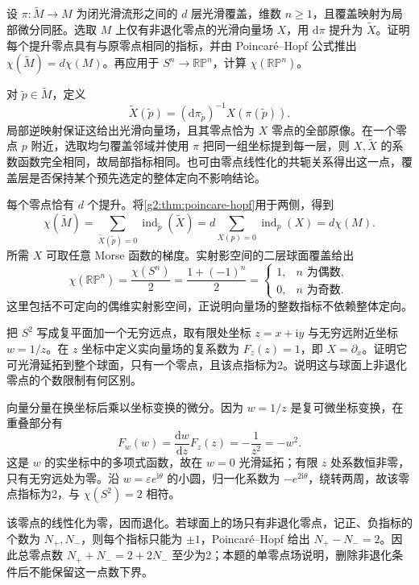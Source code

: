 \begin{exercise}\label{g2:ex:index-finite-cover}
	设 \(\pi:\widetilde M\to M\) 为闭光滑流形之间的 \(d\) 层光滑覆盖，维数 \(n\ge1\)，且覆盖映射为局部微分同胚。选取 \(M\) 上仅有非退化零点的光滑向量场 \(X\)，用 \(\mathrm d\pi\) 提升为 \(\widetilde X\)。证明每个提升零点具有与原零点相同的指标，并由 Poincaré--Hopf 公式推出 \(\chi(\widetilde M)=d\chi(M)\)。再应用于 \(S^n\to\mathbb{RP}^n\)，计算 \(\chi(\mathbb{RP}^n)\)。
\end{exercise}
\begin{solution}
	对 \(\widetilde p\in\widetilde M\)，定义
	\[
		\widetilde X(\widetilde p)
		=(\mathrm d\pi_{\widetilde p})^{-1}X(\pi(\widetilde p)).
	\]
	局部逆映射保证这给出光滑向量场，且其零点恰为 \(X\) 零点的全部原像。在一个零点 \(p\) 附近，选取均匀覆盖邻域并使用 \(\pi\) 把同一组坐标提到每一层，则 \(X,\widetilde X\) 的系数函数完全相同，故局部指标相同。也可由零点线性化的共轭关系得出这一点，覆盖层是否保持某个预先选定的整体定向不影响结论。

	每个零点恰有 \(d\) 个提升。将\cref{g2:thm:poincare-hopf}用于两侧，得到
	\[
		\chi(\widetilde M)
		=\sum_{\widetilde X(\widetilde p)=0}\operatorname{ind}_{\widetilde p}(\widetilde X)
		=d\sum_{X(p)=0}\operatorname{ind}_p(X)
		=d\chi(M).
	\]
	所需 \(X\) 可取任意 Morse 函数的梯度。实射影空间的二层球面覆盖给出
	\[
		\chi(\mathbb{RP}^n)=\frac{\chi(S^n)}2
		=\frac{1+(-1)^n}{2}
		=\begin{cases}1,&n\text{ 为偶数},\\0,&n\text{ 为奇数}.\end{cases}
	\]
	这里包括不可定向的偶维实射影空间，正说明向量场的整数指标不依赖整体定向。
\end{solution}

\begin{exercise}\label{g2:ex:sphere-single-degenerate-zero}
	把 \(S^2\) 写成复平面加一个无穷远点，取有限处坐标 \(z=x+\mathrm i y\) 与无穷远附近坐标 \(w=1/z\)。在 \(z\) 坐标中定义实向量场的复系数为 \(F_z(z)=1\)，即 \(X=\partial_x\)。证明它可光滑延拓到整个球面，只有一个零点，且该点指标为2。说明这与球面上非退化零点的个数限制有何区别。
\end{exercise}
\begin{solution}
	向量分量在换坐标后乘以坐标变换的微分。因为 \(w=1/z\) 是复可微坐标变换，在重叠部分有
	\[
		F_w(w)=\frac{\mathrm dw}{\mathrm dz}F_z(z)
		=-\frac1{z^2}=-w^2.
	\]
	这是 \(w\) 的实坐标中的多项式函数，故在 \(w=0\) 光滑延拓；有限 \(z\) 处系数恒非零，只有无穷远处为零。沿 \(w=\varepsilon e^{\mathrm i\theta}\) 的小圆，归一化系数为 \(-e^{2\mathrm i\theta}\)，绕转两周，故该零点指标为2，与 \(\chi(S^2)=2\) 相符。

	该零点的线性化为零，因而退化。若球面上的场只有非退化零点，记正、负指标的个数为 \(N_+,N_-\)，则每个指标只能为 \(\pm1\)，Poincaré--Hopf 给出 \(N_+-N_-=2\)。因此总零点数 \(N_++N_-=2+2N_-\) 至少为2；本题的单零点场说明，删除非退化条件后不能保留这一点数下界。
\end{solution}

